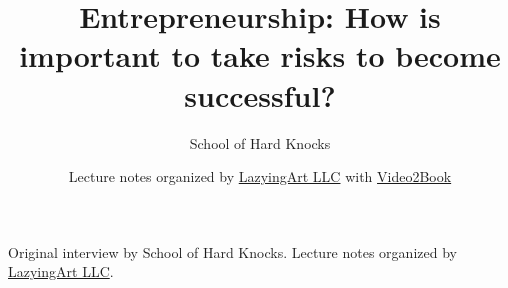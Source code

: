 \documentclass[11pt,oneside]{book}
\begin{document}
\frontmatter
\title{Entrepreneurship: How is important to take risks to become successful?}
\author{School of Hard Knocks}
\date{Lecture notes organized by \href{https://lazying.art}{LazyingArt LLC} with \href{https://github.com/lachlanchen/Video2Book}{Video2Book}}
\maketitle
\begin{center}
\small Original interview by School of Hard Knocks. Lecture notes organized by \href{https://lazying.art}{LazyingArt LLC}.
\end{center}
\clearpage
\mainmatter

\end{document}
